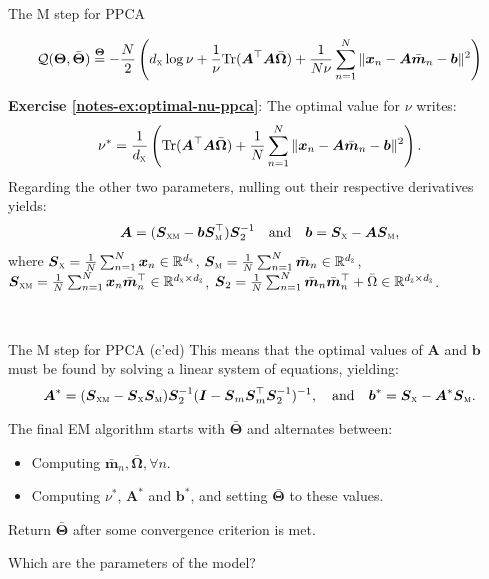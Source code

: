\documentclass{beamer}
\newcommand{\bs}[1]{\boldsymbol{#1}}
\newcommand{\exercise}[2]{\noindent\colorbox{blue!10}{\parbox{0.995\textwidth}{\textbf{Exercise \ref{notes-ex:#1}}: #2}}\\}
\begin{document}
\begin{frame}{The M step for PPCA}

{\small \begin{align*}
 \mathcal{Q}(\bs{\Theta},\bar{\bs{\Theta}}) \stackrel{\bs{\Theta}}{=} -\frac{N}{2}\left(d_{\textsc{x}}\log\nu  + \frac{1}{\nu}\textrm{Tr}(\bs{A}^\top\bs{A}\bar{\bs{\Omega}}) + \frac{1}{N\nu}\sum_{n=1}^N\|\bs{x}_n-\bs{A}\bar{\bs{m}}_n-\bs{b}\|^2\right)
\end{align*}}
  \exercise{optimal-nu-ppca}{
 The optimal value for $\nu$ writes:
 \[
  \nu^* = \frac{1}{d_{\textsc{x}}}\left(\textrm{Tr}(\bs{A}^\top\bs{A}\bar{\bs{\Omega}}) + \frac{1}{N} \sum_{n=1}^N\|\bs{x}_n-\bs{A}\bar{\bs{m}}_n-\bs{b}\|^2\right).
 \]\pause
 Regarding the other two parameters, nulling out their respective derivatives yields:
 \begin{align*}
  \bs{A} = (\bs{S}_{\textsc{xm}}-\bs{b}\bs{S}_{\textsc{m}}^\top)\bs{S}^{-1}_2 \quad\text{and}\quad \bs{b} = \bs{S}_{\textsc{x}}-\bs{A}\bs{S}_{\textsc{m}},
 \end{align*}
where $\bs{S}_{\textsc{x}}=\frac{1}{N}\sum_{n=1}^N\bs{x}_n\in\mathbb{R}^{d_{\textsc{x}}}$, $\bs{S}_{\textsc{m}}=\frac{1}{N}\sum_{n=1}^N \bar{\bs{m}}_n\in\mathbb{R}^{d_{\textsc{z}}}$, $\bs{S}_{\textsc{xm}} = \frac{1}{N}\sum_{n=1}^N \bs{x}_n\bar{\bs{m}}_n^\top\in\mathbb{R}^{d_{\textsc{x}}\times d_{\textsc{z}}}$, $\bs{S}_2=\frac{1}{N}\sum_{n=1}^N \bar{\bs{m}}_n\bar{\bs{m}}_n^\top + \bar{\Omega}\in\mathbb{R}^{d_{\textsc{z}}\times d_{\textsc{z}}}$. 
}
\end{frame}

\begin{frame}{The M step for PPCA (c'ed)}
 This means that the optimal values of $\bs{A}$ and $\bs{b}$ must be found by solving a linear system of equations, yielding:
\[
 \bs{A}^* = (\bs{S}_{\textsc{xm}}-\bs{S}_{\textsc{x}}\bs{S}_{\textsc{m}})\bs{S}_2^{-1}(\bs{I}-\bs{S}_m\bs{S}_m^\top\bs{S}_2^{-1})^{-1}, \quad\text{and}\quad \bs{b}^* = \bs{S}_{\textsc{x}}-\bs{A}^*\bs{S}_{\textsc{m}}.
\]\vspace{3mm}

The final EM algorithm starts with $\bar{\bs{\Theta}}$ and alternates between:
\begin{itemize}
 \item Computing $\bar{\bs{m}}_n,\bar{\bs{\Omega}}, \forall n$.
 \item Computing $\nu^*$, $\bs{A}^*$ and $\bs{b}^*$, and setting $\bar{\bs{\Theta}}$ to these values.
\end{itemize}
Return $\bar{\bs{\Theta}}$ after some convergence criterion is met.\vspace{6mm}

Which are the parameters of the model?

\end{frame}
\end{document}
